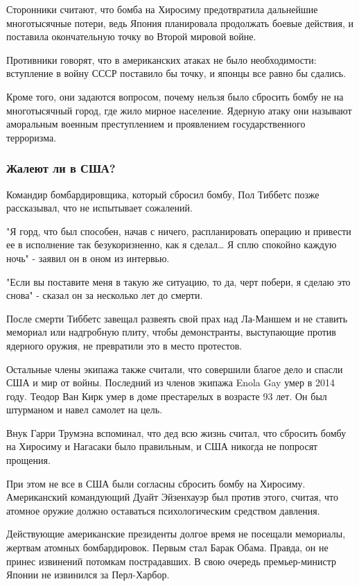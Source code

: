 \documentclass[a4paper,11pt]{extreport}
\begin{document}
Сторонники считают, что бомба на Хиросиму предотвратила дальнейшие
многотысячные потери, ведь Япония планировала продолжать боевые действия, и
поставила окончательную точку во Второй мировой войне.

Противники говорят, что в американских атаках не было необходимости: вступление
в войну СССР поставило бы точку, и японцы все равно бы сдались.

Кроме того, они задаются вопросом, почему нельзя было сбросить бомбу не на
многотысячный город, где жило мирное население. Ядерную атаку они называют
аморальным военным преступлением и проявлением государственного терроризма. 

\subsubsection{Жалеют ли в США?}

Командир бомбардировщика, который сбросил бомбу, Пол Тиббетс позже рассказывал,
что не испытывает сожалений.

"Я горд, что был способен, начав с ничего, распланировать операцию и привести
ее в исполнение так безукоризненно, как я сделал… Я сплю спокойно каждую ночь"
- заявил он в оном из интервью.

"Если вы поставите меня в такую же ситуацию, то да, черт побери, я сделаю это
снова" - сказал он за несколько лет до смерти. 

После смерти Тиббетс завещал развеять свой прах над Ла-Маншем и не ставить
мемориал или надгробную плиту, чтобы демонстранты, выступающие против ядерного
оружия, не превратили это в место протестов.

Остальные члены экипажа также считали, что совершили благое дело и спасли США и
мир от войны. Последний из членов экипажа Enola Gay умер в 2014 году. Теодор
Ван Кирк умер в доме престарелых в возрасте 93 лет. Он был штурманом и навел
самолет на цель. 

Внук Гарри Трумэна вспоминал, что дед всю жизнь считал, что сбросить бомбу на
Хиросиму и Нагасаки было правильным, и США никогда не попросят прощения.

При этом не все в США были согласны сбросить бомбу на Хиросиму. Американский
командующий Дуайт Эйзенхауэр был против этого, считая, что атомное оружие
должно оставаться психологическим средством давления.

Действующие американские президенты долгое время не посещали мемориалы, жертвам
атомных бомбардировок. Первым стал Барак Обама. Правда, он не принес извинений
потомкам пострадавших. В свою очередь премьер-министр Японии не извинился за
Перл-Харбор.
  
\end{document}
